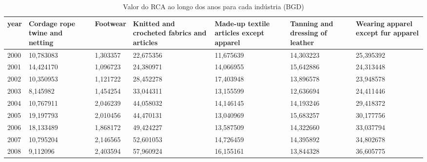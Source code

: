 \begin{table}
\centering
\caption{Valor do RCA ao longo dos anos para cada indústria (BGD)}
\begin{tabular}{p{1cm}p{2cm}p{2cm}p{2cm}p{2cm}p{2cm}p{2cm}}
\toprule
 year &  Cordage rope twine and netting &  Footwear &  Knitted and crocheted fabrics and articles &  Made-up textile articles except apparel &  Tanning and dressing of leather &  Wearing apparel except fur apparel \\
\midrule
 2000 &                       10,783083 &  1,303357 &                                   22,675356 &                                11,675639 &                        14,303223 &                           25,395392 \\
 2001 &                       14,424170 &  1,096723 &                                   24,380971 &                                14,066955 &                        15,642886 &                           24,313448 \\
 2002 &                       10,350953 &  1,121722 &                                   28,452278 &                                17,403948 &                        13,896578 &                           23,948578 \\
 2003 &                        8,145982 &  1,454254 &                                   33,044311 &                                13,155599 &                        12,636694 &                           24,411446 \\
 2004 &                       10,767911 &  2,046239 &                                   44,058032 &                                14,146145 &                        14,193246 &                           29,418372 \\
 2005 &                       19,197793 &  2,010456 &                                   44,470131 &                                13,040969 &                        15,683257 &                           30,177756 \\
 2006 &                       18,133489 &  1,868172 &                                   49,424227 &                                13,587509 &                        14,322660 &                           33,037794 \\
 2007 &                       10,795204 &  2,146565 &                                   52,601053 &                                14,726459 &                        14,395892 &                           34,802678 \\
 2008 &                        9,112096 &  2,403594 &                                   57,960924 &                                16,155161 &                        13,844328 &                           36,605775 \\

\end{tabular}
\end{table}
